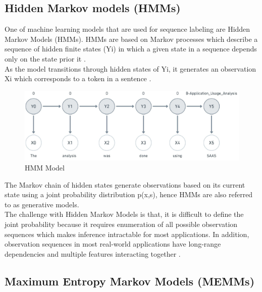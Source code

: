\subsection{Hidden Markov models (HMMs)}
\label{sec:chapter05:MLModels:HMMS}

One of machine learning models that are used for sequence labeling are Hidden Markov Models (HMMs). HMMs are based on Markov processes which describe a sequence of hidden finite states (Yi) in which a given state in a sequence depends only on the state prior it \citep{enwiki:1071684499, enwiki:1068802172}. \\

As the model transitions through hidden states of Yi, it generates an observation Xi which corresponds to a token in a sentence \citep{aggarwal2018machine}.

\begin{figure}[htbp]
	\centering
	\includegraphics[width=1\textwidth]{4.graphics/figures/models/pdf/HMM}
	\caption{HMM Model}
	\label{fig:chapter03:setup}
\end{figure}

The Markov chain of hidden states generate observations based on its current state using a joint probability distribution p(x,s), hence HMMs are also referred to as generative models. \\

The challenge with Hidden Markov Models is that, it is difficult to define the joint probability because it requires enumeration of all possible observation sequences which makes inference intractable for most applications. In addition, observation sequences in most real-world applications have long-range dependencies and multiple features interacting together \citep{bulla2006application, wallach2004conditional}.
 
\subsection{Maximum Entropy Markov Models (MEMMs)}
\label{sec:chapter05:MLModels:MEMMs}

